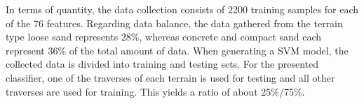 In terms of quantity, the data collection consists of 2200 training samples for each of the 76 features. 
Regarding data balance, the data gathered from the terrain type loose sand represents 28\%, whereas concrete and compact sand each represent 36\% of the total amount of data.
When generating a SVM model, the collected data is divided into training and testing sets. 
For the presented classifier, one of the traverses of each terrain is used for testing and all other traverses are used for training. 
This yields a ratio of about 25\%/75\%.
